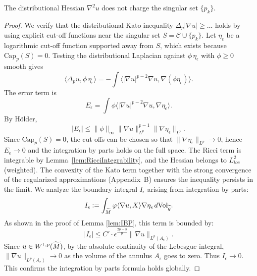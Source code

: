 \begin{lemma}\label{lem:DistHessianApp}
The distributional Hessian $\nabla^2 u$ does not charge the singular set $\{p_k\}$.
\end{lemma}
\begin{proof}
We verify that the distributional Kato inequality $\Delta_p |\nabla u| \ge \dots$ holds by using explicit cut-off functions near the singular set $S = \mathcal{C} \cup \{p_k\}$. Let $\eta_\epsilon$ be a logarithmic cut-off function supported away from $S$, which exists because $\text{Cap}_p(S) = 0$. Testing the distributional Laplacian against $\phi \, \eta_\epsilon$ with $\phi \ge 0$ smooth gives
\[ \langle \Delta_p u, \phi \, \eta_\epsilon \rangle = - \int \langle |\nabla u|^{p-2} \nabla u, \nabla (\phi \eta_\epsilon) \rangle. \]
The error term is
\[ E_\epsilon = \int \phi \langle |\nabla u|^{p-2} \nabla u, \nabla \eta_\epsilon \rangle. \]
By H\"older,
\[ |E_\epsilon| \le \|\phi\|_\infty \|\nabla u\|_{L^p}^{p-1} \|\nabla \eta_\epsilon\|_{L^p}. \]
Since $\text{Cap}_p(S)=0$, the cut-offs can be chosen so that $\|\nabla \eta_\epsilon\|_{L^p} \to 0$, hence $E_\epsilon \to 0$ and the integration by parts holds on the full space. The Ricci term is integrable by Lemma~\ref{lem:RicciIntegrability}, and the Hessian belongs to $L^2_{loc}$ (weighted). The convexity of the Kato term together with the strong convergence of the regularized approximations (Appendix~B) ensures the inequality persists in the limit.
We analyze the boundary integral $I_\epsilon$ arising from integration by parts:
\[ I_\epsilon := \int_{\widetilde{M}} \varphi \langle \nabla u, X \rangle \nabla \eta_\epsilon \,d\text{Vol}_{\widetilde{g}}. \]
As shown in the proof of Lemma \ref{lem:IBP}, this term is bounded by:
\[ |I_\epsilon| \le C' \cdot \epsilon^{\frac{2p-3}{p}} \|\nabla u\|_{L^p(A_\epsilon)}. \]
Since $u \in W^{1,p}(\widetilde{M})$, by the absolute continuity of the Lebesgue integral, $\|\nabla u\|_{L^p(A_\epsilon)} \to 0$ as the volume of the annulus $A_\epsilon$ goes to zero. Thus $I_\epsilon \to 0$. This confirms the integration by parts formula holds globally.
\end{proof}

